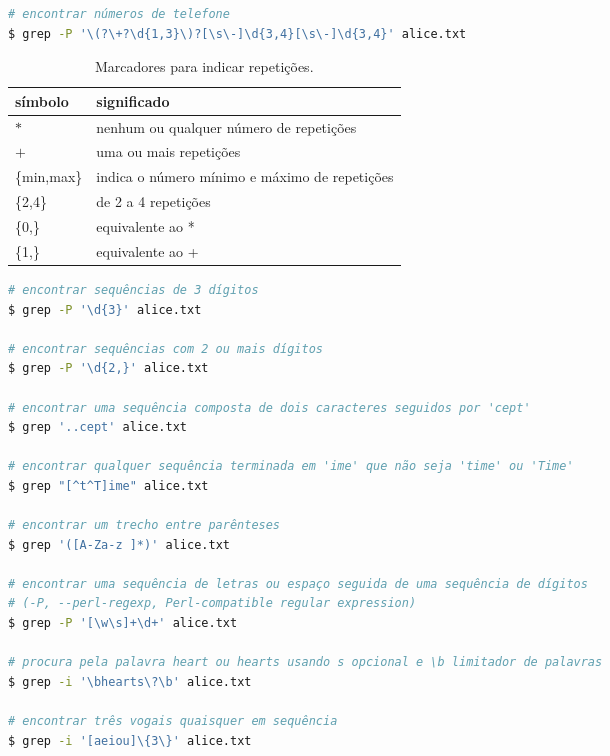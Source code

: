\begin{frame}
\begin{lstlisting}[language=bash, label=lst-grep-04, caption={Abreviações para classes de caracteres.}, postbreak=\mbox{$\hookrightarrow$\space}, basicstyle=\fontsize{8}{10}\selectfont\ttfamily]
# encontrar números de telefone
$ grep -P '\(?\+?\d{1,3}\)?[\s\-]\d{3,4}[\s\-]\d{3,4}' alice.txt
\end{lstlisting}

\framebreak


\begin{table}
\caption{Marcadores para indicar repetições.}\label{tab-regex-rep}
\begin{tabular}{ll}
símbolo & significado \\
\midrule
$\ast$      &   nenhum ou qualquer número de repetições       \\ 
$+$         &   uma ou mais repetições                        \\
\{min,max\} &   indica o número mínimo e máximo de repetições \\
\{2,4\}     &   de 2 a 4 repetições                           \\
\{0,\}      &   equivalente ao *                              \\
\{1,\}      &   equivalente ao +                              \\
\end{tabular}
\end{table}


\framebreak

\begin{lstlisting}[language=bash, label=lst-grep-05, caption={Outros exemplos com repetições.}, postbreak=\mbox{$\hookrightarrow$\space}, basicstyle=\fontsize{8}{10}\selectfont\ttfamily]
# encontrar sequências de 3 dígitos
$ grep -P '\d{3}' alice.txt

# encontrar sequências com 2 ou mais dígitos
$ grep -P '\d{2,}' alice.txt

# encontrar uma sequência composta de dois caracteres seguidos por 'cept'
$ grep '..cept' alice.txt  

# encontrar qualquer sequência terminada em 'ime' que não seja 'time' ou 'Time'
$ grep "[^t^T]ime" alice.txt

# encontrar um trecho entre parênteses
$ grep '([A-Za-z ]*)' alice.txt

# encontrar uma sequência de letras ou espaço seguida de uma sequência de dígitos
# (-P, --perl-regexp, Perl-compatible regular expression)
$ grep -P '[\w\s]+\d+' alice.txt 

# procura pela palavra heart ou hearts usando s opcional e \b limitador de palavras
$ grep -i '\bhearts\?\b' alice.txt

# encontrar três vogais quaisquer em sequência
$ grep -i '[aeiou]\{3\}' alice.txt
\end{lstlisting}



\end{frame}
